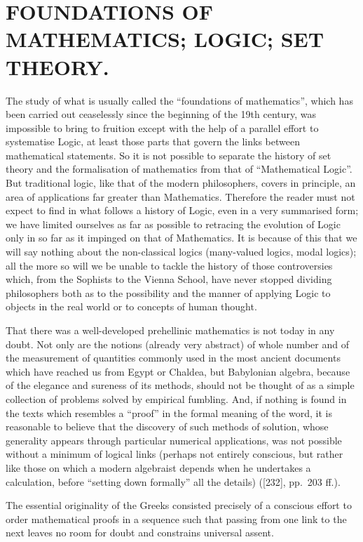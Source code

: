 \chapter{FOUNDATIONS OF MATHEMATICS; LOGIC; SET THEORY.}

The study of what is usually called the ``foundations of mathematics'', which has been carried out ceaselessly since the beginning of the 19th century, was impossible to bring to fruition except with the help of a parallel effort to systematise Logic, at least those parts that govern the links between mathematical statements. So it is not possible to separate the history of set theory and the formalisation of mathematics from that of ``Mathematical Logic''. But traditional logic, like that of the modern philosophers, covers in principle, an area of applications far greater than Mathematics. Therefore the reader must not expect to find in what follows a history of Logic, even in a very summarised form; we have limited ourselves as far as possible to retracing the evolution of Logic only in so far as it impinged on that of Mathematics. It is because of this that we will say nothing about the non-classical logics (many-valued logics, modal logics); all the more so will we be unable to tackle the history of those controversies which, from the Sophists to the Vienna School, have never stopped dividing philosophers both as to the possibility and the manner of applying Logic to objects in the real world or to concepts of human thought.

That there was a well-developed prehellinic mathematics is not today in any doubt. Not only are the notions (already very abstract) of whole number and of the measurement of quantities commonly used in the most ancient documents which have reached us from Egypt or Chaldea, but Babylonian algebra, because of the elegance and sureness of its methods, should not be thought of as a simple collection of problems solved by empirical fumbling. And, if nothing is found in the texts which resembles a ``proof'' in the formal meaning of the word, it is reasonable to believe that the discovery of such methods of solution, whose generality appears through particular numerical applications, was not possible without a minimum of logical links (perhaps not entirely conscious, but rather like those on which a modern algebraist depends when he undertakes a calculation, before ``setting down formally'' all the details) ({[}232{]}, pp.~203 ff.).

The essential originality of the Greeks consisted precisely of a conscious effort to order mathematical proofs in a sequence such that passing from one link to the next leaves no room for doubt and constrains universal assent.

